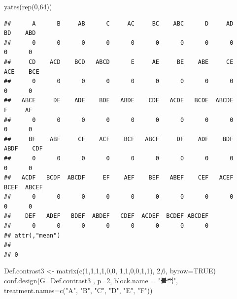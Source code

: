 \documentclass[
]{book}
\newenvironment{Shaded}{\begin{snugshade}}{\end{snugshade}}
\newcommand{\AttributeTok}[1]{\textcolor[rgb]{0.77,0.63,0.00}{#1}}
\newcommand{\ConstantTok}[1]{\textcolor[rgb]{0.00,0.00,0.00}{#1}}
\newcommand{\DecValTok}[1]{\textcolor[rgb]{0.00,0.00,0.81}{#1}}
\newcommand{\FunctionTok}[1]{\textcolor[rgb]{0.00,0.00,0.00}{#1}}
\newcommand{\NormalTok}[1]{#1}
\newcommand{\OtherTok}[1]{\textcolor[rgb]{0.56,0.35,0.01}{#1}}
\newcommand{\StringTok}[1]{\textcolor[rgb]{0.31,0.60,0.02}{#1}}
\begin{document}
\begin{Shaded}
\begin{Highlighting}[]
\FunctionTok{yates}\NormalTok{(}\FunctionTok{rep}\NormalTok{(}\DecValTok{0}\NormalTok{,}\DecValTok{64}\NormalTok{))}
\end{Highlighting}
\end{Shaded}

\begin{verbatim}
##      A      B     AB      C     AC     BC    ABC      D     AD     BD    ABD 
##      0      0      0      0      0      0      0      0      0      0      0 
##     CD    ACD    BCD   ABCD      E     AE     BE    ABE     CE    ACE    BCE 
##      0      0      0      0      0      0      0      0      0      0      0 
##   ABCE     DE    ADE    BDE   ABDE    CDE   ACDE   BCDE  ABCDE      F     AF 
##      0      0      0      0      0      0      0      0      0      0      0 
##     BF    ABF     CF    ACF    BCF   ABCF     DF    ADF    BDF   ABDF    CDF 
##      0      0      0      0      0      0      0      0      0      0      0 
##   ACDF   BCDF  ABCDF     EF    AEF    BEF   ABEF    CEF   ACEF   BCEF  ABCEF 
##      0      0      0      0      0      0      0      0      0      0      0 
##    DEF   ADEF   BDEF  ABDEF   CDEF  ACDEF  BCDEF ABCDEF 
##      0      0      0      0      0      0      0      0 
## attr(,"mean")
##   
## 0
\end{verbatim}

\begin{Shaded}
\begin{Highlighting}[]
\NormalTok{Def.contrast3 }\OtherTok{\textless{}{-}}   \FunctionTok{matrix}\NormalTok{(}\FunctionTok{c}\NormalTok{(}\DecValTok{1}\NormalTok{,}\DecValTok{1}\NormalTok{,}\DecValTok{1}\NormalTok{,}\DecValTok{1}\NormalTok{,}\DecValTok{0}\NormalTok{,}\DecValTok{0}\NormalTok{, }\DecValTok{1}\NormalTok{,}\DecValTok{1}\NormalTok{,}\DecValTok{0}\NormalTok{,}\DecValTok{0}\NormalTok{,}\DecValTok{1}\NormalTok{,}\DecValTok{1}\NormalTok{), }\DecValTok{2}\NormalTok{,}\DecValTok{6}\NormalTok{, }\AttributeTok{byrow=}\ConstantTok{TRUE}\NormalTok{)}
\FunctionTok{conf.design}\NormalTok{(}\AttributeTok{G=}\NormalTok{Def.contrast3 , }\AttributeTok{p=}\DecValTok{2}\NormalTok{, }\AttributeTok{block.name =} \StringTok{"블럭"}\NormalTok{, }\AttributeTok{treatment.names=}\FunctionTok{c}\NormalTok{(}\StringTok{"A"}\NormalTok{, }\StringTok{"B"}\NormalTok{, }\StringTok{"C"}\NormalTok{, }\StringTok{"D"}\NormalTok{, }\StringTok{"E"}\NormalTok{, }\StringTok{"F"}\NormalTok{))}
\end{Highlighting}
\end{Shaded}
\end{document}
